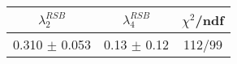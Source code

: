 \begin{tabular}{c|c||c}
$\lambda_{2}^{RSB}$ & $\lambda_4^{RSB}$ & $\chi^{2}$/ndf \\
\hline
0.310 $\pm$ 0.053 & 0.13 $\pm$ 0.12 & 112/99\\
\end{tabular}
